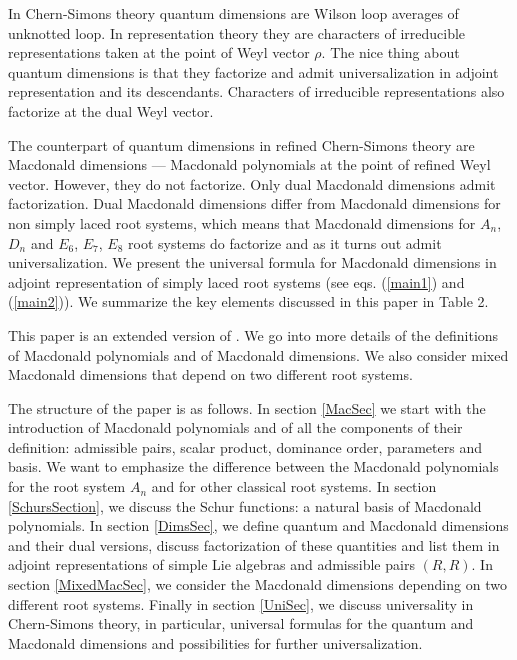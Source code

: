 \documentclass{article}
\begin{document}
In Chern-Simons theory quantum dimensions are Wilson loop averages of unknotted loop. In representation theory they are characters of irreducible representations taken at the point of Weyl vector $\rho$. The nice thing about quantum dimensions is that they factorize and admit universalization in adjoint representation \cite{Westbury03,MkrtQDims} and its descendants. Characters of irreducible representations also factorize at the dual Weyl vector.

The counterpart of quantum dimensions in refined Chern-Simons theory are Macdonald dimensions --- Macdonald polynomials at the point of refined Weyl vector. However, they do not factorize. Only dual Macdonald dimensions admit factorization. Dual Macdonald dimensions differ from Macdonald dimensions for non simply laced root systems, which means that Macdonald dimensions for $A_n$, $D_n$ and $E_6$, $E_7$, $E_8$ root systems do factorize and as it turns out admit universalization. We present the universal formula for Macdonald dimensions in adjoint representation of simply laced root systems (see eqs. (\ref{main1}) and  (\ref{main2})). We summarize the key elements discussed in this paper in Table 2.

This paper is an extended version of \cite{BM}. We go into more details of the definitions of Macdonald polynomials and of Macdonald dimensions. We also consider mixed Macdonald dimensions that depend on two different root systems.

The structure of the paper is as follows. In section \ref{MacSec}
we start with the introduction of Macdonald polynomials and of all the components of their definition: admissible pairs, scalar product, dominance order, parameters and basis. We want to emphasize the difference between the Macdonald polynomials for the root system $A_n$ and for other classical root systems. In section \ref{SchursSection}, we discuss the Schur functions: a natural basis of Macdonald polynomials. In section \ref{DimsSec}, we define quantum and Macdonald dimensions and their dual versions, discuss factorization of these quantities and list them in adjoint representations of simple Lie algebras and admissible pairs $(R,R)$. In section \ref{MixedMacSec}, we consider the Macdonald dimensions depending on two different root systems. Finally in section \ref{UniSec}, we discuss universality in Chern-Simons theory, in particular, universal formulas for the quantum and Macdonald dimensions and possibilities for further universalization.
\end{document}
